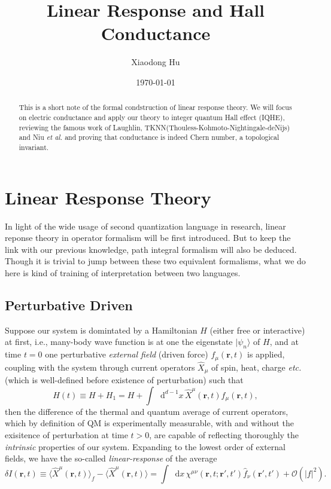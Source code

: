 \documentclass[10pt,nofootinbib]{revtex4}
\newcommand*\dd{\mathop{}\!\mathrm{d}}
\begin{document}
\title{Linear Response and Hall Conductance}%

\author{Xiaodong Hu}

\date{\today}


\begin{abstract}
	This is a short note of the formal condstruction of linear response theory. We will focus on electric conductance and apply our theory to integer quantum Hall effect (IQHE), reviewing the famous work of Laughlin, TKNN(Thouless-Kohmoto-Nightingale-deNijs) and Niu \textit{et al.} and proving that conductance is indeed Chern number, a topological invariant.
\end{abstract}
\maketitle
\tableofcontents

\section{Linear Response Theory}
	In light of the wide usage of second quantization language in research, linear reponse theory in operator formalism will be first introduced. But to keep the link with our previous knowledge, path integral formalism will also be deduced. Though it is trivial to jump between these two equivalent formalisms, what we do here is kind of training of interpretation between two languages.
	\subsection{Perturbative Driven}
		Suppose our system is domintated by a Hamiltonian $H$ (either free or interactive) at first, i.e., many-body wave function is at one the eigenstate $|\psi_n\rangle$ of $H$, and at time $t=0$ one perturbative \emph{external field} (driven force) $f_\mu(\bm{r},t)$ is applied, coupling with the system through current operators $\hat{X}_\mu$ of spin, heat, charge \textit{etc.} (which is well-defined before existence of perturbation) such that
		\begin{equation}\label{1.1.1}
			H(t)\equiv H+H_1=H+\int\dd^{d-1}x\,\hat{X}^\mu(\bm{r},t)f_\mu(\bm{r},t),
		\end{equation}
		then the difference of the thermal and quantum average of current operators, which by definition of QM is experimentally measurable, with and without the exisitence of perturbation at time $t>0$, are capable of reflecting thoroughly the \emph{intrinsic} properties of our system. Expanding to the lowest order of external fields, we have the so-called \emph{linear-response} of the average
		\begin{equation}\label{1.1.2}
			\delta I(\bm{r},t)\equiv\langle \hat{X}^\mu(\bm{r},t)\rangle_f-\langle \hat{X}^\mu(\bm{r},t)\rangle=\int\dd x\,\chi^{\mu\nu}(\bm{r},t;\bm{r'},t')\hat{f}_\nu(\bm{r'},t')+\mathcal{O}(|f|^2).
		\end{equation}
\end{document}
